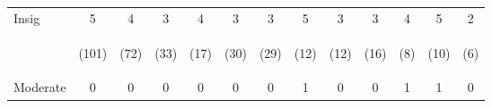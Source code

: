 \begin{tabular}{lcccccccccccc}
\hline \noalign{\smallskip}Insig & 5 & 4 & 3 & 4 & 3 & 3 & 5 & 3 & 3 & 4 & 5 & 2\\
 & \begin{footnotesize}(101)\end{footnotesize} & \begin{footnotesize}(72)\end{footnotesize} & \begin{footnotesize}(33)\end{footnotesize} & \begin{footnotesize}(17)\end{footnotesize} & \begin{footnotesize}(30)\end{footnotesize} & \begin{footnotesize}(29)\end{footnotesize} & \begin{footnotesize}(12)\end{footnotesize} & \begin{footnotesize}(12)\end{footnotesize} & \begin{footnotesize}(16)\end{footnotesize} & \begin{footnotesize}(8)\end{footnotesize} & \begin{footnotesize}(10)\end{footnotesize} & \begin{footnotesize}(6)\end{footnotesize}\\
\noalign{\smallskip}Moderate & 0 & 0 & 0 & 0 & 0 & 0 & 1 & 0 & 0 & 1 & 1 & 0\\

\end{tabular}
